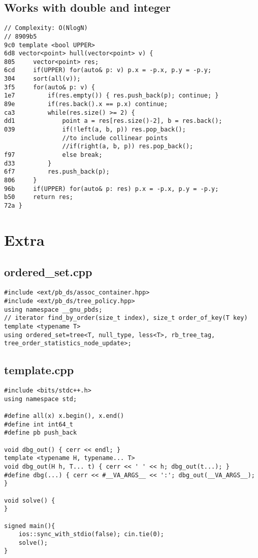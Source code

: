 \documentclass[11pt, a4paper, twoside]{article}
\begin{document}
\subsection{Works with double and integer}
\begin{lstlisting}
// Complexity: O(NlogN)
// 8909b5
9c0 template <bool UPPER>
6d8 vector<point> hull(vector<point> v) {
805 	vector<point> res;
6cd 	if(UPPER) for(auto& p: v) p.x = -p.x, p.y = -p.y;
304 	sort(all(v));
3f5 	for(auto& p: v) {
1e7 		if(res.empty()) { res.push_back(p); continue; }
89e 		if(res.back().x == p.x) continue;
ca3 		while(res.size() >= 2) {
dd1 			point a = res[res.size()-2], b = res.back();
039 			if(!left(a, b, p)) res.pop_back();
    			//to include collinear points
    			//if(right(a, b, p)) res.pop_back();
f97 			else break;
d33 		}
6f7 		res.push_back(p);
806 	}
96b 	if(UPPER) for(auto& p: res) p.x = -p.x, p.y = -p.y;
b50 	return res;
72a }
\end{lstlisting}

\pagebreak


%
%

\section{Extra}

\subsection{ordered_set.cpp}
\begin{lstlisting}
#include <ext/pb_ds/assoc_container.hpp>
#include <ext/pb_ds/tree_policy.hpp>
using namespace __gnu_pbds;
// iterator find_by_order(size_t index), size_t order_of_key(T key)
template <typename T> 
using ordered_set=tree<T, null_type, less<T>, rb_tree_tag, tree_order_statistics_node_update>;
\end{lstlisting}

\subsection{template.cpp}
\begin{lstlisting}
#include <bits/stdc++.h>
using namespace std;

#define all(x) x.begin(), x.end()
#define int int64_t
#define pb push_back

void dbg_out() { cerr << endl; }
template <typename H, typename... T>
void dbg_out(H h, T... t) { cerr << ' ' << h; dbg_out(t...); }
#define dbg(...) { cerr << #__VA_ARGS__ << ':'; dbg_out(__VA_ARGS__); }

void solve() {
}

signed main(){
	ios::sync_with_stdio(false); cin.tie(0);
	solve();
}
\end{lstlisting}
\end{document}
